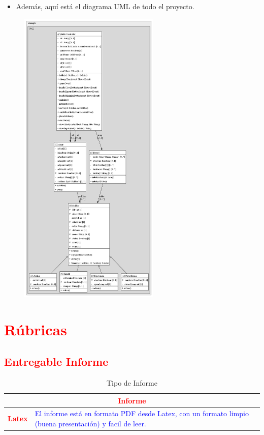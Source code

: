 \documentclass{article}
\begin{document}
	\begin{itemize}	
		\item Además, aquí está el diagrama UML de todo el proyecto.
	\end{itemize}
	\begin{figure}[H]
		\centering
	\includegraphics[width=0.6\textwidth,keepaspectratio]{img/HelloController_structure.png}
	\end{figure}
	
	
	\section{\textcolor{red}{Rúbricas}}
	
	\subsection{\textcolor{red}{Entregable Informe}}
	\begin{table}[H]
		\caption{Tipo de Informe}
		\setlength{\tabcolsep}{0.5em} %
		{\renewcommand{\arraystretch}{1.5}%
		\begin{tabular}{|p{3cm}|p{12cm}|}
			\hline
			\multicolumn{2}{|c|}{\textbf{\textcolor{red}{Informe}}}  \\
			\hline 
			\textbf{\textcolor{red}{Latex}} & \textcolor{blue}{El informe está en formato PDF desde Latex,  con un formato limpio (buena presentación) y facil de leer.}   \\ 
			\hline 
			
			
		\end{tabular}
	}
	\end{table}
	
\end{document}

